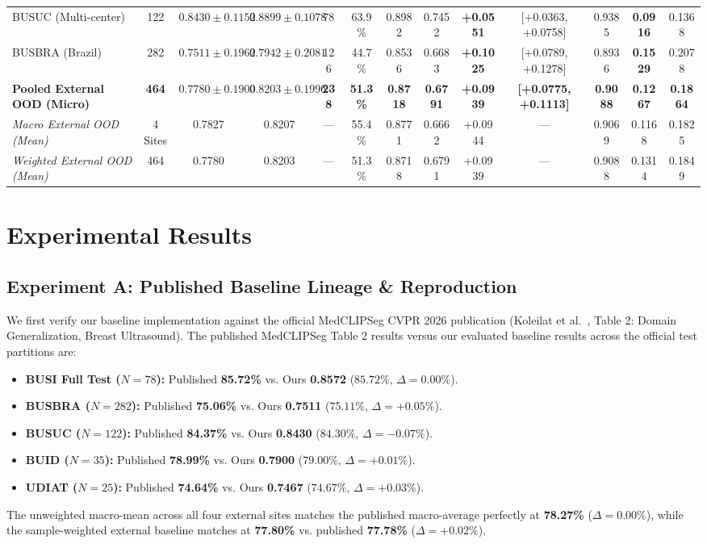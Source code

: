 \documentclass[10pt,journal,compsoc]{IEEEtran}
\begin{document}
\begin{table}[t]
{\begin{tabular}{lcccccccccccc}
BUSUC (Multi-center) & 122 & $0.8430 \pm 0.1152$ & $0.8899 \pm 0.1078$ & 78 & 63.9\% & 0.8982 & 0.7452 & \textbf{+0.0551} & [+0.0363, +0.0758] & 0.9385 & \textbf{0.0916} & 0.1368 \\
BUSBRA (Brazil) & 282 & $0.7511 \pm 0.1962$ & $0.7942 \pm 0.2081$ & 126 & 44.7\% & 0.8536 & 0.6683 & \textbf{+0.1025} & [+0.0789, +0.1278] & 0.8936 & \textbf{0.1529} & 0.2078 \\
\midrule
\textbf{Pooled External OOD (Micro)} & \textbf{464} & $\mathbf{0.7780 \pm 0.1900}$ & $\mathbf{0.8203 \pm 0.1996}$ & \textbf{238} & \textbf{51.3\%} & \textbf{0.8718} & \textbf{0.6791} & \textbf{+0.0939} & \textbf{[+0.0775, +0.1113]} & \textbf{0.9088} & \textbf{0.1267} & \textbf{0.1864} \\
\textit{Macro External OOD (Mean)} & 4 Sites & 0.7827 & 0.8207 & --- & 55.4\% & 0.8771 & 0.6662 & +0.0944 & --- & 0.9069 & 0.1168 & 0.1825 \\
\textit{Weighted External OOD (Mean)}& 464 & 0.7780 & 0.8203 & --- & 51.3\% & 0.8718 & 0.6791 & +0.0939 & --- & 0.9088 & 0.1314 & 0.1849 \\
\bottomrule
\end{tabular}%
}
\end{table}

\section{Experimental Results}

\subsection{Experiment A: Published Baseline Lineage \& Reproduction}
We first verify our baseline implementation against the official MedCLIPSeg CVPR 2026 publication (Koleilat et al.~\cite{koleilat2026medclipseg}, Table 2: Domain Generalization, Breast Ultrasound). The published MedCLIPSeg Table 2 results versus our evaluated baseline results across the official test partitions are:
\begin{itemize}
    \item \textbf{BUSI Full Test ($N=78$):} Published \textbf{85.72\%} vs. Ours \textbf{0.8572} ($85.72\%$, $\Delta = 0.00\%$).
    \item \textbf{BUSBRA ($N=282$):} Published \textbf{75.06\%} vs. Ours \textbf{0.7511} ($75.11\%$, $\Delta = +0.05\%$).
    \item \textbf{BUSUC ($N=122$):} Published \textbf{84.37\%} vs. Ours \textbf{0.8430} ($84.30\%$, $\Delta = -0.07\%$).
    \item \textbf{BUID ($N=35$):} Published \textbf{78.99\%} vs. Ours \textbf{0.7900} ($79.00\%$, $\Delta = +0.01\%$).
    \item \textbf{UDIAT ($N=25$):} Published \textbf{74.64\%} vs. Ours \textbf{0.7467} ($74.67\%$, $\Delta = +0.03\%$).
\end{itemize}
The unweighted macro-mean across all four external sites matches the published macro-average perfectly at \textbf{78.27\%} ($\Delta = 0.00\%$), while the sample-weighted external baseline matches at \textbf{77.80\%} vs. published \textbf{77.78\%} ($\Delta = +0.02\%$).
\end{document}

